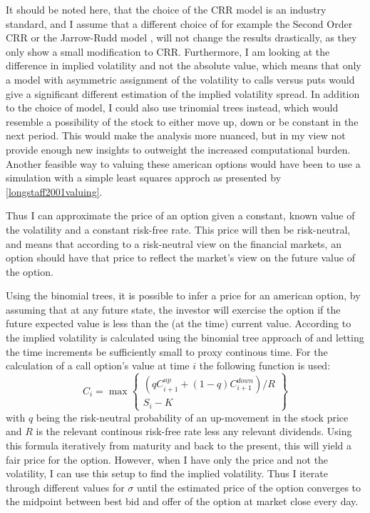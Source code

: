 It should be noted here, that the choice of the CRR model is an industry standard, and I assume that a different choice of for example the Second Order CRR or the Jarrow-Rudd model \citep{jarrow1982approximate}, will not change the results drastically, as they only show a small modification to CRR. Furthermore, I am looking at the difference in implied volatility and not the absolute value, which means that only a model with asymmetric assignment of the volatility to calls versus puts would give a significant different estimation of the implied volatility spread. In addition to the choice of model, I could also use trinomial trees instead, which would resemble a possibility of the stock to either move up, down or be constant in the next period. This would make the analysis more nuanced, but in my view not provide enough new insights to outweight the increased computational burden. Another feasible way to valuing these american options would have been to use a simulation with a simple least squares approch as presented by \ref{longstaff2001valuing}. 

Thus I can approximate the price of an option given a constant, known value of the volatility and a constant risk-free rate. This price will then be risk-neutral, and means that according to a risk-neutral view on the financial markets, an option should have that price to reflect the market's view on the future value of the option. 

Using the binomial trees, it is possible to infer a price for an american option, by assuming that at any future state, the investor will exercise the option if the future expected value is less than the (at the time) current value. According to \cite{optionmetrics} the implied volatility is calculated using the binomial tree approach of \cite{cox1979option} and letting the time increments be sufficiently small to proxy continous time. For the calculation of a call option's value at time $i$ the following function is used:
\begin{equation}
	C_{i}=\max\left\{ \begin{array}{c}
		\left(qC_{i+1}^{up}+\left(1-q\right)C_{i+1}^{down}\right)/R\\
		S_{i}-K
	\end{array}\right\} 
	\label{eq:call_price}
\end{equation}
with $q$ being the risk-neutral probability of an up-movement in the stock price and $R$ is the relevant continous risk-free rate less any relevant dividends. Using this formula iteratively from maturity and back to the present, this will yield a fair price for the option. However, when I have only the price and not the volatility, I can use this setup to find the implied volatility. Thus I iterate through different values for $\sigma$ until the estimated price of the option converges to the midpoint between best bid and offer of the option at market close every day. 

